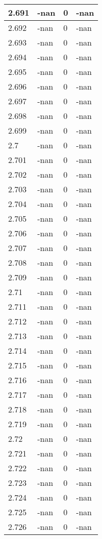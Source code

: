 \documentclass[a4paper,14pt]{extarticle}
\begin{document}
\begin{longtable}{||m{3cm}||m{3cm}|m{3cm}||m{3cm}||}
\hline
2.691 & -nan & 0 & -nan\\
\hline
2.692 & -nan & 0 & -nan\\
\hline
2.693 & -nan & 0 & -nan\\
\hline
2.694 & -nan & 0 & -nan\\
\hline
2.695 & -nan & 0 & -nan\\
\hline
2.696 & -nan & 0 & -nan\\
\hline
2.697 & -nan & 0 & -nan\\
\hline
2.698 & -nan & 0 & -nan\\
\hline
2.699 & -nan & 0 & -nan\\
\hline
2.7 & -nan & 0 & -nan\\
\hline
2.701 & -nan & 0 & -nan\\
\hline
2.702 & -nan & 0 & -nan\\
\hline
2.703 & -nan & 0 & -nan\\
\hline
2.704 & -nan & 0 & -nan\\
\hline
2.705 & -nan & 0 & -nan\\
\hline
2.706 & -nan & 0 & -nan\\
\hline
2.707 & -nan & 0 & -nan\\
\hline
2.708 & -nan & 0 & -nan\\
\hline
2.709 & -nan & 0 & -nan\\
\hline
2.71 & -nan & 0 & -nan\\
\hline
2.711 & -nan & 0 & -nan\\
\hline
2.712 & -nan & 0 & -nan\\
\hline
2.713 & -nan & 0 & -nan\\
\hline
2.714 & -nan & 0 & -nan\\
\hline
2.715 & -nan & 0 & -nan\\
\hline
2.716 & -nan & 0 & -nan\\
\hline
2.717 & -nan & 0 & -nan\\
\hline
2.718 & -nan & 0 & -nan\\
\hline
2.719 & -nan & 0 & -nan\\
\hline
2.72 & -nan & 0 & -nan\\
\hline
2.721 & -nan & 0 & -nan\\
\hline
2.722 & -nan & 0 & -nan\\
\hline
2.723 & -nan & 0 & -nan\\
\hline
2.724 & -nan & 0 & -nan\\
\hline
2.725 & -nan & 0 & -nan\\
\hline
2.726 & -nan & 0 & -nan\\

\end{longtable}
\end{document}
